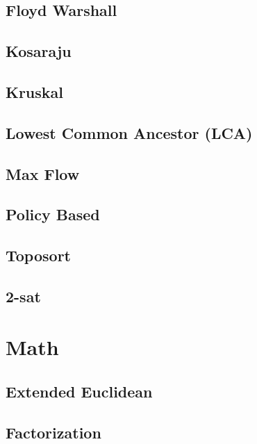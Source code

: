 \subsection{Floyd Warshall}
\raggedbottom
\hrulefill
\subsection{Kosaraju}
\raggedbottom
\hrulefill
\subsection{Kruskal}
\raggedbottom
\hrulefill
\subsection{Lowest Common Ancestor (LCA)}
\raggedbottom
\hrulefill
\subsection{Max Flow}
\raggedbottom
\hrulefill
\subsection{Policy Based}
\raggedbottom
\hrulefill
\subsection{Toposort}
\raggedbottom
\hrulefill
\subsection{2-sat}
\raggedbottom
\hrulefill

\section{Math}
\subsection{Extended Euclidean}
\raggedbottom
\hrulefill
\subsection{Factorization}
\raggedbottom
\hrulefill
